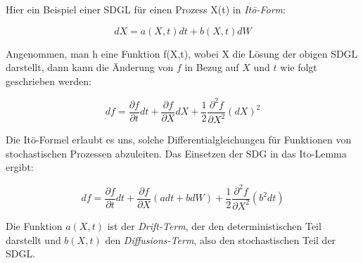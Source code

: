 Hier ein Beispiel einer SDGL für einen Prozess X(t) in \textit{Itō-Form}:

\begin{equation}
	dX = a(X,t) dt + b(X,t) dW
\end{equation}

Angenommen, man h eine Funktion f(X,t), wobei X die Lösung der obigen SDGL darstellt, dann kann die Änderung von $ f $ in Bezug auf $ X $ und $ t $ wie folgt geschrieben werden:

\begin{equation}
	df = \frac{\partial f}{\partial t} dt + \frac{\partial f}{\partial X} dX + \frac{1}{2} \frac{\partial^2 f}{\partial X^2} (dX)^2	
\end{equation}

Die Itō-Formel erlaubt es uns, solche Differentialgleichungen für Funktionen von stochastischen Prozessen abzuleiten. Das Einsetzen der SDG in das Ito-Lemma ergibt:

\begin{equation}
	df = \frac{\partial f}{\partial t} dt + \frac{\partial f}{\partial X} (a dt + b dW) + \frac{1}{2} \frac{\partial^2 f}{\partial X^2} (b^2 dt)
\end{equation}

Die Funktion $ a(X,t) $ ist der \textit{Drift-Term}, der den deterministischen Teil darstellt und $ b(X,t) $ den \textit{Diffusions-Term}, also den stochastischen Teil der SDGL.

